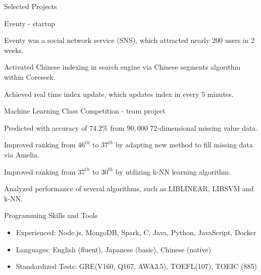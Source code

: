 \documentclass{cv}
\begin{document}
\begin{cvSection}{Selected Projects}
\begin{projectSubsection}{Eventy}{ - }{startup}
\item Eventy was a social network service (SNS), which attracted nearly 200 users in 2 weeks.
\item Activated Chinese indexing in search engine via Chinese segments algorithm within Coreseek.
\item Achieved real time index update, which updates index in every 5 minutes.

\end{projectSubsection}


\begin{projectSubsection}{Machine Learning Class Competition}{ - }{team project}

\item Predicted with accuracy of $74.2\%$ from $90,000$ 72-dimensional missing value data.
\item Improved ranking from $46^{th}$ to $37^{th}$ by adapting new method to fill missing data via Amelia.
\item Improved ranking from $37^{th}$ to $30^{th}$ by utilizing k-NN learning algorithm.
\item Analyzed performance of several algorithms, such as LIBLINEAR, LIBSVM and k-NN.

\end{projectSubsection}

\end{cvSection}


\begin{cvSection}{Programming Skills and Tools}

\begin{itemize}[label=$\cdot$,leftmargin=0em]

\item Experienced: Node.js, MongoDB, Spark, C, Java, Python, JavaScript, Docker
\item Languages: English (fluent), Japanese (basic), Chinese (native)
\item Standardized Tests: GRE(V160, Q167, AWA3.5), TOEFL(107), TOEIC (885)

\end{itemize}

\end{cvSection}
\end{document}
